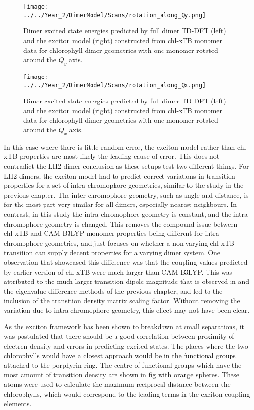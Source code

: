 \begin{figure}
    \centering
    \texttt{[image: ../../Year\_2/DimerModel/Scans/rotation\_along\_Qy.png]}
    \label{fig:chl_xtb_rot_Qy}
    \caption{Dimer excited state energies predicted by full dimer TD-DFT (left)
    and the exciton model (right) constructed from chl-xTB monomer data for chlorophyll 
    dimer geometries with one monomer rotated around the $Q_y$ axis.}
\end{figure}

\begin{figure}
    \centering
    \texttt{[image: ../../Year\_2/DimerModel/Scans/rotation\_along\_Qx.png]}
    \label{fig:chl_xtb_rot_Qx}
    \caption{Dimer excited state energies predicted by full dimer TD-DFT (left)
    and the exciton model (right) constructed from chl-xTB monomer data for chlorophyll 
    dimer geometries with one monomer rotated around the $Q_x$ axis.}
\end{figure}

In this case where there is little random error, the exciton model rather than chl-xTB
properties are most likely the leading cause of error. This does not contradict 
the LH2 dimer conclusion as these setups test two different things. For LH2 dimers,
the exciton model had to predict correct variations in transition properties for
a set of intra-chromophore geometries, similar to the study in the previous chapter.
The inter-chromophore geometry, such as angle and distance, is for the most part
very similar for all dimers, especially nearest neighbours. In contrast, in this
study the intra-chromophore geometry is constant, and the intra-chromophore geometry
is changed. This removes the compound issue between chl-xTB and CAM-B3LYP monomer
properties being different for intra-chromophore geometries, and just focuses on
whether a non-varying chl-xTB transition can supply decent properties for a varying
dimer system. One observation that showcased this difference was that the coupling
values predicted by earlier version of chl-xTB were much larger than CAM-B3LYP. 
This was attributed to the much larger transition dipole magnitude that is observed
in \dscf and the eigenvalue difference methods of the previous chapter, and led
to the inclusion of the transition density matrix scaling factor. Without removing
the variation due to intra-chromophore geometry, this effect may not have been clear.

As the exciton framework has been shown to breakdown at small separations, it was
postulated that there should be a good correlation between proximity of electron
density and errors in predicting excited states. The places where the two chlorophylls
would have a closest approach would be in the functional groups attached to the 
porphyrin ring. The centre of functional groups which have the most amount of transition
density are shown in fig with orange spheres. These atoms were used to calculate
the maximum reciprocal distance between the chlorophylls, which would correspond
to the leading terms in the exciton coupling elements.

